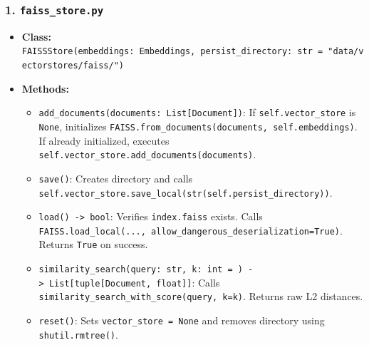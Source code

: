 \documentclass[
]{article}
\providecommand{\tightlist}{%
  \setlength{\itemsep}{0pt}\setlength{\parskip}{0pt}}
\begin{document}
\subsubsection{\texorpdfstring{1.
\texttt{faiss\_\allowbreak store.\allowbreak py}}{1. faiss\_store.py}}\label{faiss_store.py}

\begin{itemize}
\tightlist
\item
  \textbf{Class:}
  \texttt{FAISSStore(\allowbreak embeddings:\ \allowbreak Embeddings,\allowbreak \ \allowbreak persist\_\allowbreak directory:\ \allowbreak str\ \allowbreak =\allowbreak \ \allowbreak "data/\allowbreak vectorstores/\allowbreak faiss/\allowbreak ")\allowbreak }
\item
  \textbf{Methods:}

  \begin{itemize}
  \tightlist
  \item
    \texttt{add\_\allowbreak documents(\allowbreak documents:\ \allowbreak List{[}Document{]})\allowbreak }: If
    \texttt{self.\allowbreak vector\_\allowbreak store} is \texttt{None}, initializes
    \texttt{FAISS.\allowbreak from\_\allowbreak documents(\allowbreak documents,\allowbreak \ \allowbreak self.\allowbreak embeddings)\allowbreak }. If
    already initialized, executes
    \texttt{self.\allowbreak vector\_\allowbreak store.\allowbreak add\_\allowbreak documents(\allowbreak documents)\allowbreak }.
  \item
    \texttt{save(\allowbreak )\allowbreak }: Creates directory and calls
    \texttt{self.\allowbreak vector\_\allowbreak store.\allowbreak save\_\allowbreak local(\allowbreak str(\allowbreak self.\allowbreak persist\_\allowbreak directory)\allowbreak )\allowbreak }.
  \item
    \texttt{load(\allowbreak )\allowbreak \ \allowbreak -\textgreater{}\allowbreak \ \allowbreak bool}: Verifies
    \texttt{index.\allowbreak faiss} exists. Calls
    \texttt{FAISS.\allowbreak load\_\allowbreak local(\allowbreak .\allowbreak .\allowbreak .,\allowbreak \ \allowbreak allow\_\allowbreak dangerous\_\allowbreak deserialization=\allowbreak True)\allowbreak }.
    Returns \texttt{True} on success.
  \item
    \texttt{similarity\_\allowbreak search(\allowbreak query:\ \allowbreak str,\allowbreak \ \allowbreak k:\ \allowbreak int\ \allowbreak =\allowbreak \ )\allowbreak \ \allowbreak -\textgreater{}\allowbreak \ \allowbreak List{[}tuple{[}Document,\allowbreak \ \allowbreak float{]}{]}}:
    Calls \texttt{similarity\_\allowbreak search\_\allowbreak with\_\allowbreak score(\allowbreak query,\allowbreak \ \allowbreak k=\allowbreak k)\allowbreak }. Returns
    raw L2 distances.
  \item
    \texttt{reset(\allowbreak )\allowbreak }: Sets \texttt{vector\_\allowbreak store\ \allowbreak =\allowbreak \ \allowbreak None} and removes
    directory using \texttt{shutil.\allowbreak rmtree(\allowbreak )\allowbreak }.
  \end{itemize}
\end{itemize}
\end{document}
